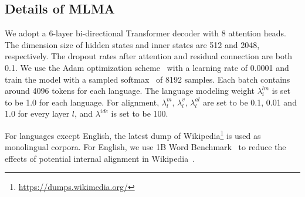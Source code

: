 \documentclass[11pt,a4paper]{article}
\begin{document}
	
	\subsection{Details of MLMA}  
	We adopt a 6-layer bi-directional Transformer decoder with 8 attention heads. The dimension size of hidden states and inner states are 512 and 2048, respectively. The dropout rates after attention and residual connection are both 0.1. We use the Adam optimization scheme~\cite{kingma2014adam} with a learning rate of 0.0001 and train the model with a sampled softmax~\cite{jean15on} of 8192 samples. Each batch contains around 4096 tokens for each language. The language modeling weight $\lambda_i^{lm}$ is set to be 1.0 for each language. For alignment, $\lambda_l^m$, $\lambda_l^v$, $\lambda_l^{al}$ are set to be 0.1, 0.01 and 1.0 for every layer $l$, and $\lambda^{ide}$ is set to be 100.
	
	For languages except English, the latest dump of Wikipedia\footnote{\url{https://dumps.wikimedia.org/}} is used as monolingual corpora. For English, we use 1B Word Benchmark~\cite{chelba2013one} to reduce the effects of potential internal alignment in Wikipedia~\cite{zirikly15cross,tsai16cross}. 
	
	
\end{document}
